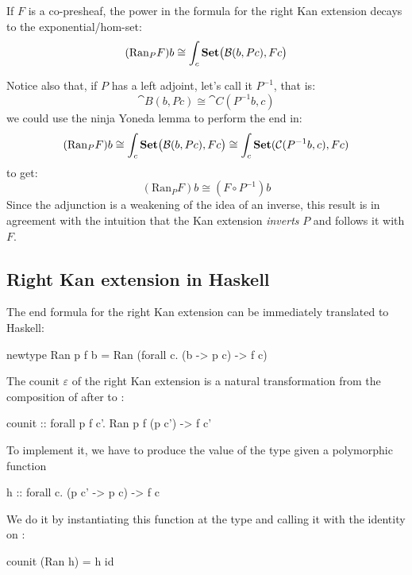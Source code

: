 \documentclass[DaoFP]{subfiles}
\begin{document}
If $F$ is a co-presheaf, the power in the formula for the right Kan extension decays to the exponential/hom-set:
  \[ (\text{Ran}_P F) b \cong \int_c \mathbf{Set} \big( \mathcal{B} (b, P c), F c\big) \]
 
 Notice also that, if $P$ has a left adjoint, let's call it $P^{-1}$, that is:
 \[ \cat B(b, P c) \cong \cat C(P^{-1} b, c) \]
 we could use the ninja Yoneda lemma to perform the end in:
 \[ (\text{Ran}_P F) b \cong \int_c \mathbf{Set} \big( \mathcal{B} (b, P c), F c\big) \cong \int_c \mathbf{Set}(\mathcal{C}(P^{-1} b, c), F c)\]
to get:
 \[  (\text{Ran}_P F) b \cong (F \circ P^{-1}) b \]
 Since the adjunction is a weakening of the idea of an inverse, this result is in agreement with the intuition that the Kan extension \emph{inverts} $P$ and follows it with $F$.
 
 \subsection{Right Kan extension in Haskell}
The end formula for the right Kan extension can be immediately translated to Haskell:
 \begin{haskell}
newtype Ran p f b = Ran (forall c. (b -> p c) -> f c)
 \end{haskell}
 
 The counit $\varepsilon$ of the right Kan extension is a natural transformation from the composition of  after  to :
 \begin{haskell}
counit :: forall p f c'. Ran p f (p c') -> f c'
\end{haskell}
To implement it, we have to produce the value of the type  given a polymorphic function 
 \begin{haskell}
h :: forall c. (p c' -> p c) -> f c
\end{haskell}
We do it by instantiating this function at the type  and calling it with the identity on :
 \begin{haskell}
counit (Ran h) = h id
\end{haskell}
\end{document}
